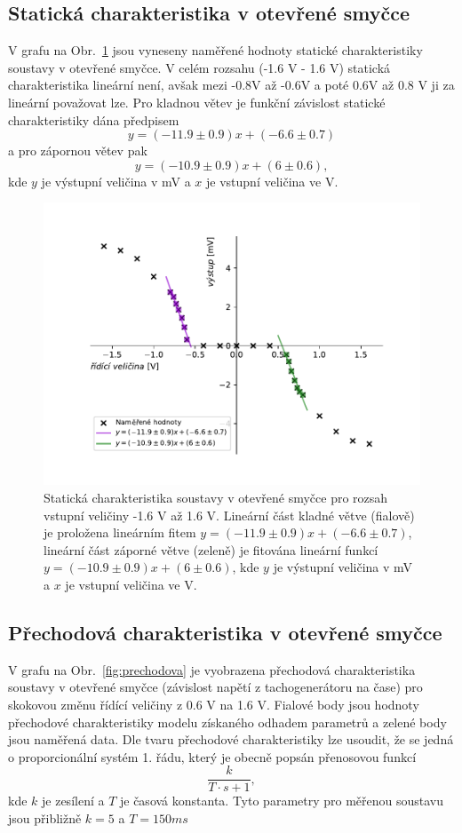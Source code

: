 	\subsection{Statická charakteristika v otevřené smyčce}
		V grafu na Obr.~\ref{fig:staticka} jsou vyneseny naměřené hodnoty statické charakteristiky soustavy v otevřené smyčce. 
		V celém rozsahu (-1.6 V - 1.6 V) statická charakteristika lineární není, avšak mezi -0.8V až -0.6V a poté 0.6V až 0.8 V ji za lineární považovat lze.
		Pro kladnou větev je funkční závislost statické charakteristiky dána předpisem $$y=(-11.9\pm 0.9)x+(-6.6\pm 0.7)$$ a pro zápornou větev pak $$y=(-10.9\pm 0.9)x+(6\pm 0.6),$$ 
		kde $y$ je výstupní veličina v mV a $x$ je vstupní veličina ve V. 
		\begin{figure}[!hbt] 
			\centering
			\includegraphics[]{img/graf_staticka.pdf} 
			\caption{Statická charakteristika soustavy v otevřené smyčce pro rozsah vstupní veličiny -1.6 V až 1.6 V. 
			Lineární část kladné větve (fialově) je proložena lineárním fitem $y=(-11.9\pm 0.9)x+(-6.6\pm 0.7)$, 
			lineární část záporné větve (zeleně) je fitována lineární funkcí $y=(-10.9\pm 0.9)x+(6\pm 0.6)$, 
			kde $y$ je výstupní veličina v mV a $x$ je vstupní veličina ve V.} 
			\label{fig:staticka}
		\end{figure}


	\subsection{Přechodová charakteristika v otevřené smyčce}
		V grafu na Obr.~\ref{fig:prechodova} je vyobrazena přechodová charakteristika soustavy v otevřené smyčce (závislost napětí z tachogenerátoru na čase) 
		pro skokovou změnu řídící veličiny z 0.6 V na 1.6 V. Fialové body jsou hodnoty přechodové charakteristiky modelu získaného odhadem parametrů a zelené body jsou naměřená data.
		Dle tvaru přechodové charakteristiky lze usoudit, že se jedná o proporcionální systém 1. řádu, který je obecně popsán přenosovou funkcí
		\begin{equation}
			\frac{k}{T\cdot s + 1},
		\end{equation}
		kde $k$ je zesílení a $T$ je časová konstanta. Tyto parametry pro měřenou soustavu jsou přibližně $k=5$ a $T=150\unit{ms}$

